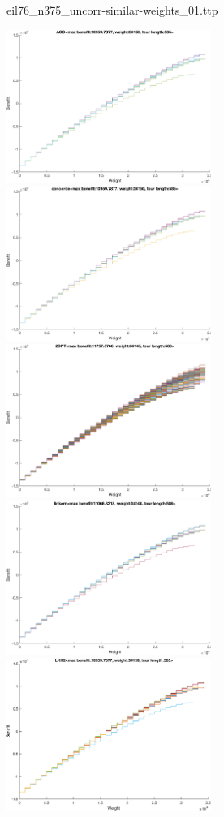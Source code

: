\documentclass{article}
\begin{document}
\newpage
eil76\_n375\_uncorr-similar-weights\_01.ttp

\noindent
\includegraphics[width=0.5\textwidth]{eil76figs/eil76_n375_uncorr-similar-weights_01.ttp.aco.txt.eps}
\includegraphics[width=0.5\textwidth]{eil76figs/eil76_n375_uncorr-similar-weights_01.ttp.con.txt.eps}
\includegraphics[width=0.5\textwidth]{eil76figs/eil76_n375_uncorr-similar-weights_01.ttp.inv.txt.eps}
\includegraphics[width=0.5\textwidth]{eil76figs/eil76_n375_uncorr-similar-weights_01.ttp.lkh.txt.eps}
\includegraphics[width=0.5\textwidth]{eil76figs/eil76_n375_uncorr-similar-weights_01.ttp.lkh2.txt.eps}
\end{document}
